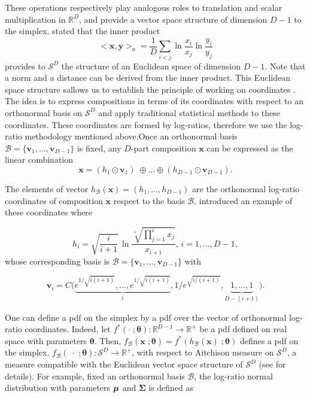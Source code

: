 \documentclass[12pt, a4paper]{article}
\newcommand{\m}[1]{\boldsymbol{#1}}
\begin{document}
These operations respectively play analogous roles to translation and scalar multiplication in $\mathbb{R}^D$, and provide a vector space
structure of dimension $D-1$ to the simplex. \cite{pawlowsky2001geometric} stated that the inner product 
\begin{equation}
<\textbf{x}, \textbf{y}>_a = \frac{1}{D} \sum_{i < j} \ln \frac{x_i}{x_j} \ln \frac{y_i}{y_j}
\label{inner_prod}
\end{equation}
 provides to $\mathcal{S}^D$ the structure of an Euclidean space of dimension $D-1$. Note that a norm and a distance can be derived from the inner product.
This Euclidean space structure sallows us to establish the principle of working on coordinates \citep{figueras2011principle}. The idea is to express compositions in terms of its coordinates with respect to an orthonormal basis on $\mathcal{S}^D$ and apply
traditional statistical methods to these coordinates. These coordinates are formed by log-ratios, therefore we use the log-ratio methodology mentioned above.Once an orthonormal basis $\mathcal{B} = \{\textbf{v}_1, \dots, \textbf{v}_{D-1}\}$ is fixed, any $D$-part composition $\textbf{x}$ can be expressed as the linear combination
\[
\textbf{x} = (h_1 \odot \textbf{v}_1)\; \oplus \dots  \oplus (h_{D-1} \odot \textbf{v}_{D-1}).
\]

The elements of vector $h_\mathcal{B}(\textbf{x})=(h_1, \dots, h_{D-1})$ are the orthonormal log-ratio coordinates of composition $\textbf{x}$ respect to the basis $\mathcal{B}$. \cite{egozcue2003isometric} introduced an example of these coordinates where

\begin{equation}
\label{eilr}
h_i=\sqrt{\frac{i}{i+1}}\,\ln\frac{\sqrt[i]
{\prod_{j=1}^{i} x_j}}{x_{i+1}},\,i=1,\dots,D-1,
\end{equation}
whose corresponding basis is $\mathcal{B} = \{\textbf{v}_1, \dots, \textbf{v}_{D-1}\}$ with

\[
\textbf{v}_i = C\Big( \underbrace{e^{1/\sqrt{i(i+1)}}, \dots, e^{1/\sqrt{i(i+1)}}}_{i}, 1/e^{\sqrt{ i/(i+1)}}, \underbrace{1, \dots, 1}_{D-(i+1)} \Big).
\]


One can define a pdf on the simplex by a pdf over the vector of orthonormal log-ratio coordinates. Indeed, let $f^*(\cdot \;; \m\theta) : \mathbb{R}^{D-1} \rightarrow \mathbb{R}^+$ be a pdf defined on real space with parameters $\m\theta$. Then, $f_\mathcal{B}(\mathbf{x}\;; \m\theta) = f^*(h_\mathcal{B}(\textbf{x})\;; \m\theta)$ defines a pdf on the simplex, $f_\mathcal{B}(\;\cdot\;; \m\theta): \mathcal{S}^D \rightarrow \mathbb{R}^+$, with respect to Aitchison measure on $\mathcal{S}^D$, a measure compatible with the Euclidean vector space structure of $\mathcal{S}^D$ (see \cite{mateu2013normal} for details). For example, fixed an orthonormal basis $\mathcal{B}$, the log-ratio normal distribution with parameters $\mbox{\boldmath \(\mu\)}$ and $\mathbf{\Sigma}$ is defined as
\end{document}
